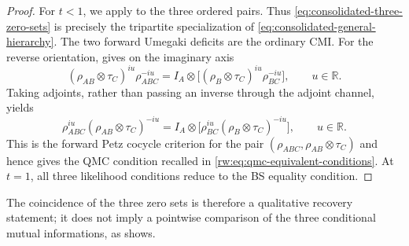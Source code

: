 \documentclass[11pt]{article}
\theoremstyle{remark}
\newcommand{\1}{\mathbbm{1}}
\begin{document}
\begin{proof}
For $t<1$, we apply
 to the three ordered
pairs.  Thus \eqref{eq:consolidated-three-zero-sets} is precisely the
tripartite specialization of
\eqref{eq:consolidated-general-hierarchy}.  The two forward Umegaki
deficits are the ordinary CMI.  For the reverse orientation,
 gives on the imaginary axis
\begin{equation*}
 (\rho_{AB}\otimes\tau_C)^{iu}\rho_{ABC}^{-iu}
 =I_A\otimes
 \bigl[(\rho_B\otimes\tau_C)^{iu}\rho_{BC}^{-iu}\bigr],
 \qquad u\in\mathbb R.
\end{equation*}
Taking adjoints, rather than passing an inverse through the adjoint
channel, yields
\begin{equation*}
 \rho_{ABC}^{iu}(\rho_{AB}\otimes\tau_C)^{-iu}
 =I_A\otimes
 \bigl[\rho_{BC}^{iu}(\rho_B\otimes\tau_C)^{-iu}\bigr],
 \qquad u\in\mathbb R.
\end{equation*}
This is the forward Petz cocycle criterion for the pair
$(\rho_{ABC},\rho_{AB}\otimes\tau_C)$ and hence gives the QMC
condition recalled in \eqref{rw:eq:qmc-equivalent-conditions}.  At
$t=1$, all three
likelihood conditions reduce to the BS equality condition.
\end{proof}

The coincidence of the three zero sets is therefore a qualitative
recovery statement; it does not imply a pointwise comparison of the
three conditional mutual informations, as
shows.
\end{document}
